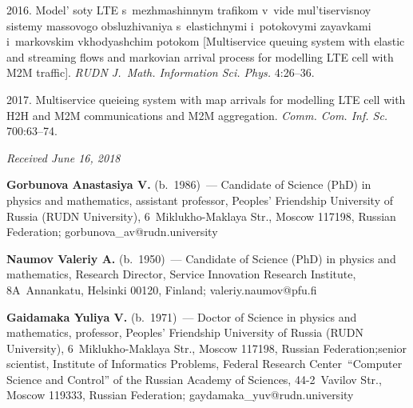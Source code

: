 \begin{multicols}{2}
{{\begin{thebibliography}{99}
2016. Model' soty LTE s~mezhmashinnym trafikom v~vide mul'tiservisnoy sistemy 
massovogo obsluzhivaniya s~elastichnymi i~potokovymi zayavkami 
i~markovskim vkhodyashchim potokom [Multiservice queuing system with
 elastic and streaming flows and markovian arrival process for modelling 
 LTE cell with M2M traffic]. 
 \textit{RUDN J.~Math. Information Sci. Phys.} 4:26--36.
 
 2017.
Multiservice queieing system with map arrivals for modelling LTE cell with H2H 
and M2M communications and M2M aggregation. 
\textit{Comm. Com. Inf. Sc.} 700:63--74.
 
 \end{thebibliography}

 }
 }

\end{multicols}

\vspace*{-6pt}

\hfill{\small\textit{Received June 16, 2018}}



 
\Contr

\noindent
\textbf{Gorbunova Anastasiya V.} (b.\ 1986)~--- 
Candidate of Science (PhD) in physics and mathematics, 
assistant professor, Peoples' Friendship University of Russia 
(RUDN University), 6~Miklukho-Maklaya Str., 
Moscow 117198, Russian Federation; \mbox{gorbunova\_av@rudn.university}

\vspace*{3pt}

\noindent
\textbf{Naumov Valeriy A.} (b.\ 1950)~--- 
Candidate of Science (PhD) in physics and mathematics, 
Research Director, Service Innovation Research Institute, 8A~Annankatu, Helsinki 
00120, Finland; \mbox{valeriy.naumov@pfu.fi}

\vspace*{3pt}

\noindent
\textbf{Gaidamaka Yuliya V.} (b.\ 1971)~--- Doctor of Science in physics and mathematics, 
professor, Peoples' Friendship University of Russia 
(RUDN University), 6~Miklukho-Maklaya Str., 
Moscow 117198, Russian Federation;\linebreak senior scientist, 
Institute of Informatics Problems, 
Federal Research Center\ ``Computer Science and Control''\linebreak 
of the Russian Academy of Sciences, 44-2~Vavilov Str., Moscow 119333, 
Russian Federation; \mbox{gaydamaka\_yuv@rudn.university}

